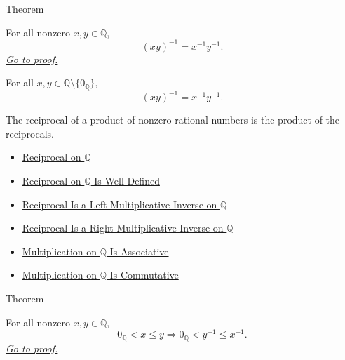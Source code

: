 \begin{theorembox}{Theorem}
\begin{theorem}
\label{thm:reciprocal-of-product-on-q}
For all nonzero $x,y\in\mathbb{Q}$,
\[
(xy)^{-1}=x^{-1}y^{-1}.
\]
\hyperref[prf:reciprocal-of-product-on-q]{\textit{Go to proof.}}
\end{theorem}
\end{theorembox}

\begin{remark*}
For all $x,y\in\mathbb{Q}\setminus\{0_{\mathbb{Q}}\}$,
\[
(xy)^{-1}=x^{-1}y^{-1}.
\]
\end{remark*}

\begin{remark*}[Interpretation]
The reciprocal of a product of nonzero rational numbers is the product of the
reciprocals.
\end{remark*}

\begin{dependencies}
\begin{itemize}
  \item \hyperref[def:reciprocal-on-q-classes]{Reciprocal on $\mathbb{Q}$}
  \item \hyperref[thm:reciprocal-on-q-well-defined]{Reciprocal on $\mathbb{Q}$ Is Well-Defined}
  \item \hyperref[thm:reciprocal-left-multiplicative-inverse-on-q]{Reciprocal Is a Left Multiplicative Inverse on $\mathbb{Q}$}
  \item \hyperref[cor:reciprocal-right-multiplicative-inverse-on-q]{Reciprocal Is a Right Multiplicative Inverse on $\mathbb{Q}$}
  \item \hyperref[thm:multiplication-on-q-associative]{Multiplication on $\mathbb{Q}$ Is Associative}
  \item \hyperref[thm:multiplication-on-q-commutative]{Multiplication on $\mathbb{Q}$ Is Commutative}
\end{itemize}
\end{dependencies}

\begin{theorembox}{Theorem}
\begin{theorem}
\label{thm:reciprocal-reverses-nonstrict-order-on-positives-q}
For all nonzero $x,y\in\mathbb{Q}$,
\[
0_{\mathbb{Q}}<x\le y
\Longrightarrow
0_{\mathbb{Q}}<y^{-1}\le x^{-1}.
\]
\hyperref[prf:reciprocal-reverses-nonstrict-order-on-positives-q]{\textit{Go to proof.}}
\end{theorem}
\end{theorembox}

